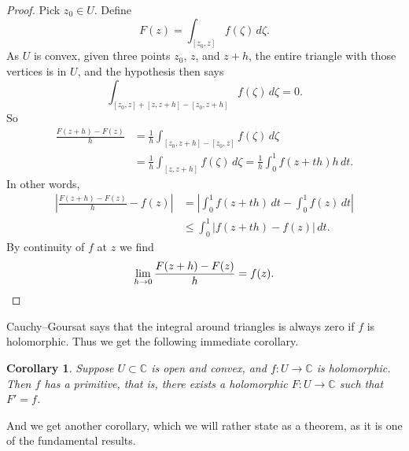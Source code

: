\documentclass[12pt,openany]{book}
\newcommand{\abs}[1]{\left\lvert {#1} \right\rvert}
\newcommand{\C}{{\mathbb{C}}}
\theoremstyle{plain}
\newtheorem{cor}[thm]{Corollary}
\theoremstyle{remark}
\theoremstyle{definition}
\theoremstyle{exercise}
\theoremstyle{example}
\begin{document}
\begin{proof}
Pick $z_0 \in U$.  Define
\begin{equation*}
F(z) = \int_{[z_0,z]} f(\zeta) \, d\zeta .
\end{equation*}
As $U$ is convex, given three points $z_0$, $z$, and $z+h$,
the entire triangle with those vertices is in $U$, and the
hypothesis then says
\begin{equation*}
\int_{[z_0,z]+[z,z+h]-[z_0,z+h]} f(\zeta) \, d\zeta = 0 .
\end{equation*}
So
\begin{equation*}
\begin{split}
\frac{F(z+h)-F(z)}{h} &=
\frac{1}{h}
\int_{[z_0,z+h]-[z_0,z]} f(\zeta) \, d\zeta
\\
& =
\frac{1}{h}
\int_{[z,z+h]} f(\zeta) \, d\zeta
=
\frac{1}{h}
\int_0^1 f(z+th) h \, dt .
\end{split}
\end{equation*}
In other words,
\begin{equation*}
\begin{split}
\abs{
\frac{F(z+h)-F(z)}{h} 
-
f(z)
}
& =
\abs{
\int_0^1 f(z+th) \, dt
-
\int_0^1 f(z) \, dt
}
\\
& \leq
\int_0^1 \abs{f(z+th)-f(z)} \, dt .
\end{split}
\end{equation*}
By continuity of $f$ at $z$ we find
\begin{equation*}
\lim_{h \to 0}
\frac{F(z+h)-F(z)}{h} 
=
f(z) . \qedhere
\end{equation*}
\end{proof}

Cauchy--Goursat says that the integral around
triangles is always zero if $f$ is holomorphic.  Thus we get
the following immediate corollary.

\begin{cor} \label{cor:primitiveinconvex}
Suppose $U \subset \C$ is open and convex,
and $f \colon U \to \C$ is holomorphic.
Then $f$ has a primitive, that is,
there exists a holomorphic $F \colon U \to \C$
such that $F' = f$.
\end{cor}

And we get another corollary, which we will rather state
as a theorem, as it is one of the fundamental results.
\end{document}
